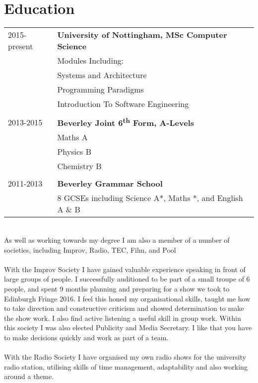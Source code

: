 \documentclass[12pt, a4paper]{article}
\begin{document}
\section*{Education}
\begin{tabular}[c]{p{2.5cm}|p{20cm}}
  2015-present  & \textbf{University of Nottingham, MSc Computer Science}
                \\
                & Modules Including:
                \\
                & Systems and Architecture
                \\
                & Programming Paradigms
                \\
                & Introduction To Software Engineering
                \\ \\
  2013-2015     & \textbf{Beverley Joint 6\textsuperscript{th} Form, A-Levels}
                \\
                & Maths A
                \\
                & Physics B
                \\
                & Chemistry B
                \\ \\
  2011-2013     & \textbf{Beverley Grammar School}
                \\
                & 8 GCSEs including Science A*, Maths *, and English A \& B
                \\
\end{tabular}
\\[10pt]
As well as working towards my degree I am also a member of a number of societies, including Improv, Radio, TEC, Film, and Pool\\
\\
With the Improv Society I have gained valuable experience speaking in front of large groups of people.
I successfully auditioned to be part of a small troupe of 6 people, and spent 9 months planning and preparing for a show we took to Edinburgh Fringe 2016.
I feel this honed my organisational skills, taught me how to take direction and constructive criticism and showed determination to make the show work.
I also find active listening a useful skill in group work.
Within this society I was also elected Publicity and Media Secretary.
I like that you have to make decisions quickly and work as part of a team.\\
\\
With the Radio Society I have organised my own radio shows for the university radio station, utilising skills of time management, adaptability and also working around a theme.\\
\end{document}
